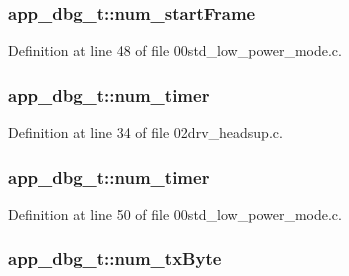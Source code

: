 \subsubsection[{\texorpdfstring{num\+\_\+start\+Frame}{num_startFrame}}]{ app\+\_\+dbg\+\_\+t\+::num\+\_\+start\+Frame}\hypertarget{structapp__dbg__t_a4bae1b438f9b04582f365da078b2d021}{}\label{structapp__dbg__t_a4bae1b438f9b04582f365da078b2d021}


Definition at line 48 of file 00std\+\_\+low\+\_\+power\+\_\+mode.\+c.

\subsubsection[{\texorpdfstring{num\+\_\+timer}{num_timer}}]{ app\+\_\+dbg\+\_\+t\+::num\+\_\+timer}\hypertarget{structapp__dbg__t_a770f6ecff698309585ae6576e63bc1db}{}\label{structapp__dbg__t_a770f6ecff698309585ae6576e63bc1db}


Definition at line 34 of file 02drv\+\_\+headsup.\+c.

\subsubsection[{\texorpdfstring{num\+\_\+timer}{num_timer}}]{ app\+\_\+dbg\+\_\+t\+::num\+\_\+timer}\hypertarget{structapp__dbg__t_a9c107485250f10b5eecb8a03bafabe98}{}\label{structapp__dbg__t_a9c107485250f10b5eecb8a03bafabe98}


Definition at line 50 of file 00std\+\_\+low\+\_\+power\+\_\+mode.\+c.

\subsubsection[{\texorpdfstring{num\+\_\+tx\+Byte}{num_txByte}}]{ app\+\_\+dbg\+\_\+t\+::num\+\_\+tx\+Byte}\hypertarget{structapp__dbg__t_ab63e981adf43dd108896ca45f76f238b}{}\label{structapp__dbg__t_ab63e981adf43dd108896ca45f76f238b}


